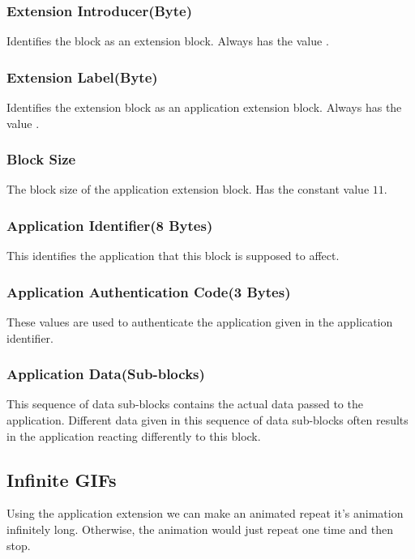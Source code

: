 \subsubsection{Extension Introducer(Byte)}

Identifies the block as an extension block. Always has the value
.

\subsubsection{Extension Label(Byte)}

Identifies the extension block as an application extension
block. Always has the value .

\subsubsection{Block Size}

The block size of the application extension block. Has the constant
value $11$.

\subsubsection{Application Identifier(8 Bytes)}

This identifies the application that this block is supposed to
affect.

\subsubsection{Application Authentication Code(3 Bytes)}

These values are used to authenticate the application given in the
application identifier.

\subsubsection{Application Data(Sub-blocks)}

This sequence of data sub-blocks contains the actual data passed to
the application. Different data given in this sequence of data
sub-blocks often results in the application reacting differently to
this block.

\subsection{Infinite GIFs}

Using the application extension we can make an animated \gif repeat
it's animation infinitely long. Otherwise, the animation would just
repeat one time and then stop.


